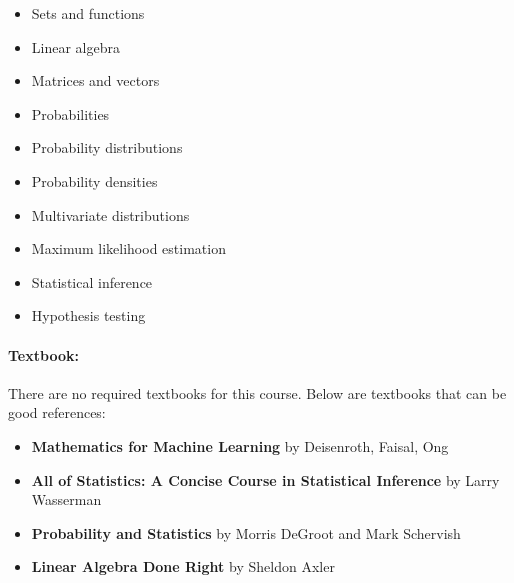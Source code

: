 \documentclass[12pt]{scrartcl}
\begin{document}
\begin{multicols}{2}
\begin{itemize}
\item Sets and functions
\item Linear algebra
\item Matrices and vectors
\item Probabilities
\item Probability distributions 
\item Probability densities
\item Multivariate distributions
\item Maximum likelihood estimation
\item Statistical inference
\item Hypothesis testing
\end{itemize}
\end{multicols}

\paragraph{Textbook:} 
There are no required textbooks for this course. Below are textbooks that can be good references: 
\begin{itemize}
\item \textbf{Mathematics for Machine Learning} by Deisenroth, Faisal, Ong
\item \textbf{All of Statistics: A Concise Course in Statistical Inference} by Larry Wasserman 
\item \textbf{Probability and Statistics} by Morris DeGroot and Mark Schervish
\item \textbf{Linear Algebra Done Right} by Sheldon Axler
\end{itemize}
\end{document}
